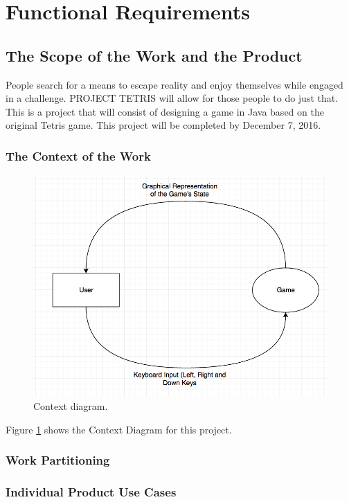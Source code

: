 \documentclass[12pt, titlepage]{article}
\begin{document}
\section{Functional Requirements}


\subsection{The Scope of the Work and the Product}
People search for a means to escape reality and enjoy themselves while engaged in a challenge. PROJECT TETRIS will allow for those people to do just that. This is a project that will consist of designing a game in Java based on the original Tetris game. This project will be completed by December 7, 2016.

\subsubsection{The Context of the Work}

\begin{figure}[h]
	\includegraphics[width=\linewidth]{fig1.png}
	\caption{Context diagram.}
	\label{fig:context}
\end{figure}
Figure \ref{fig:context} shows the Context Diagram for this project. 

\subsubsection{Work Partitioning}

\subsubsection{Individual Product Use Cases}
\end{document}
